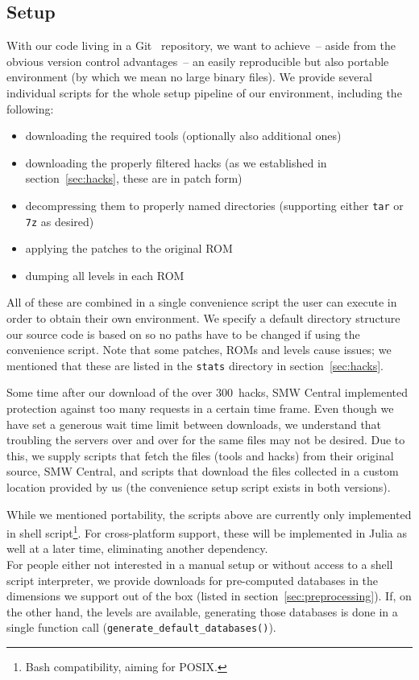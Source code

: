\subsection{Setup}

With our code living in a Git~\cite{Git} repository, we want to
achieve~-- aside from the obvious version control advantages~-- an
easily reproducible but also portable environment (by which we mean no
large binary files). We provide several individual scripts for the
whole setup pipeline of our environment, including the following:
\begin{itemize}
\item downloading the required tools (optionally also additional ones)
\item downloading the properly filtered hacks (as we established in
  section~\ref{sec:hacks}, these are in patch form)
\item decompressing them to properly named directories (supporting
  either \texttt{tar} or \texttt{7z} as desired)
\item applying the patches to the original ROM
\item dumping all levels in each ROM
\end{itemize}
All of these are combined in a single convenience script the user can
execute in order to obtain their own environment. We specify a default
directory structure our source code is based on so no paths have to be
changed if using the convenience script. Note that some patches, ROMs
and levels cause issues; we mentioned that these are listed in the
\texttt{stats} directory in section~\ref{sec:hacks}.

Some time after our download of the over 300~hacks, SMW Central
implemented protection against too many requests in a certain time
frame. Even though we have set a generous wait time limit between
downloads, we understand that troubling the servers over and over for
the same files may not be desired. Due to this, we supply scripts that
fetch the files (tools and hacks) from their original source, SMW
Central, and scripts that download the files collected in a custom
location provided by us (the convenience setup script exists in both
versions).

While we mentioned portability, the scripts above are currently only
implemented in shell script\footnote{Bash compatibility, aiming for
  POSIX.}. For cross-platform support, these will be implemented in
Julia as well at a later time, eliminating another dependency. \\
For people either not interested in a manual setup or without access
to a shell script interpreter, we provide downloads for pre-computed
databases in the dimensions we support out of the box (listed in
section~\ref{sec:preprocessing}). If, on the other hand, the levels
are available, generating those databases is done in a single function
call (\texttt{generate\_default\_databases()}).

